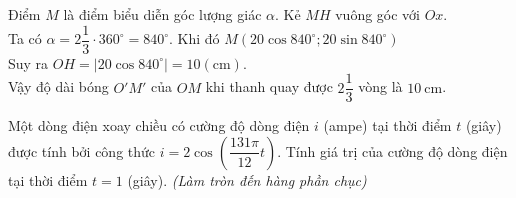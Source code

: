 \begin{bt}
{\begin{center}
		\end{center}
		Điểm $M$ là điểm biểu diễn góc lượng giác $\alpha $. Kẻ $MH$ vuông góc với $Ox$.\\
		Ta có $\alpha =2\dfrac{1}{3}\cdot 360^\circ =840^\circ $. Khi đó $M\left(20\cos 840^\circ;20\sin 840^\circ\right)$\\
		Suy ra $OH=\left| 20\cos 840^\circ\right|=10\left(\mathrm{cm}\right)$.\\ Vậy độ dài bóng $O'M'$ của $OM$ khi thanh quay được $2\dfrac{1}{3}$ vòng là $10 ~\mathrm{cm}$.
	}
\end{bt}

\begin{bt}%

	Một dòng điện xoay chiều có cường độ dòng điện $i$ (ampe) tại thời điểm $t$ (giây) được tính bởi công thức $i=2\cos\left(\dfrac{131\pi}{12}t\right)$. Tính giá trị của cường độ dòng điện tại thời điểm  $t=1$ (giây). \textit{(Làm tròn đến hàng phần chục)} 
	
\end{bt}

